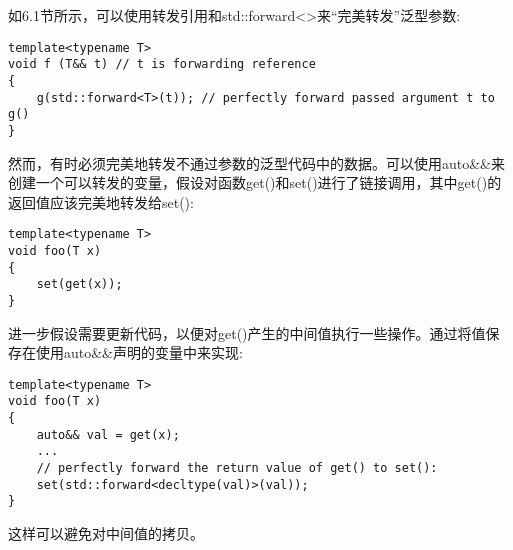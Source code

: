 如6.1节所示，可以使用转发引用和std::forward<>来“完美转发”泛型参数:

\begin{lstlisting}[style=styleCXX]
template<typename T>
void f (T&& t) // t is forwarding reference
{
	g(std::forward<T>(t)); // perfectly forward passed argument t to g()
}
\end{lstlisting}

然而，有时必须完美地转发不通过参数的泛型代码中的数据。可以使用auto\&\&来创建一个可以转发的变量，假设对函数get()和set()进行了链接调用，其中get()的返回值应该完美地转发给set():

\begin{lstlisting}[style=styleCXX]
template<typename T>
void foo(T x)
{
	set(get(x));
}
\end{lstlisting}

进一步假设需要更新代码，以便对get()产生的中间值执行一些操作。通过将值保存在使用auto\&\&声明的变量中来实现:

\begin{lstlisting}[style=styleCXX]
template<typename T>
void foo(T x)
{
	auto&& val = get(x);
	...
	// perfectly forward the return value of get() to set():
	set(std::forward<decltype(val)>(val));
}
\end{lstlisting}

这样可以避免对中间值的拷贝。








































